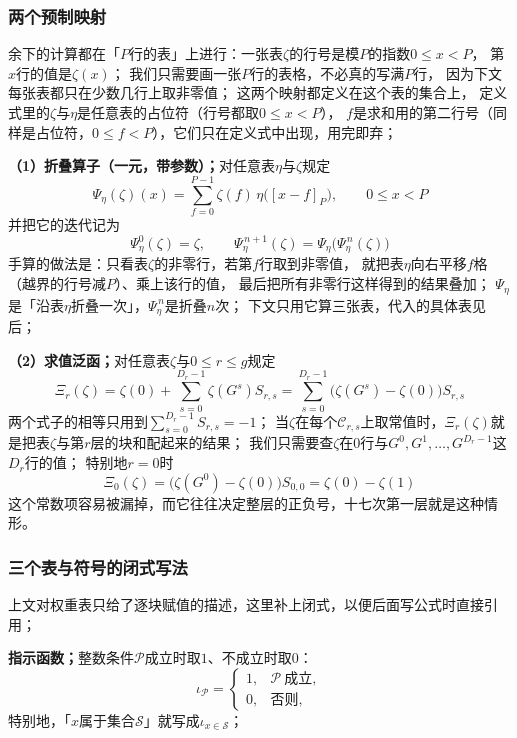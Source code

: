 \documentclass[UTF8,a4paper,11pt]{ctexart}
\begin{document}
\subsubsection{两个预制映射}
余下的计算都在「$P$行的表」上进行：一张表$\zeta$的行号是模$P$的指数$0\le x<P$，
第$x$行的值是$\zeta(x)$；
我们只需要画一张$P$行的表格，不必真的写满$P$行，
因为下文每张表都只在少数几行上取非零值；
这两个映射都定义在这个表的集合上，
定义式里的$\zeta$与$\eta$是任意表的占位符（行号都取$0\le x<P$），
$f$是求和用的第二行号（同样是占位符，$0\le f<P$），它们只在定义式中出现，用完即弃；

\textbf{（1）折叠算子（一元，带参数）；}对任意表$\eta$与$\zeta$规定
\[
 \Psi_\eta(\zeta)(x)=\sum_{f=0}^{P-1}\zeta(f)\,\eta\bigl([x-f]_P\bigr),\qquad 0\le x<P
\]
并把它的迭代记为
\[
 \Psi_\eta^{0}(\zeta)=\zeta,\qquad
 \Psi_\eta^{\,n+1}(\zeta)=\Psi_\eta\bigl(\Psi_\eta^{\,n}(\zeta)\bigr)
\]
手算的做法是：只看表$\zeta$的非零行，若第$f$行取到非零值，
就把表$\eta$向右平移$f$格（越界的行号减$P$）、乘上该行的值，
最后把所有非零行这样得到的结果叠加；
$\Psi_\eta$是「沿表$\eta$折叠一次」，$\Psi_\eta^{\,n}$是折叠$n$次；
下文只用它算三张表，代入的具体表见后；\par

\textbf{（2）求值泛函；}对任意表$\zeta$与$0\le r\le g$规定
\[
 \Xi_r(\zeta)=\zeta(0)+\sum_{s=0}^{D_r-1}\zeta(G^s)S_{r,s}
 =\sum_{s=0}^{D_r-1}\bigl(\zeta(G^s)-\zeta(0)\bigr)S_{r,s}
\]
两个式子的相等只用到$\sum_{s=0}^{D_r-1}S_{r,s}=-1$；
当$\zeta$在每个$\mathscr{C}_{r,s}$上取常值时，$\Xi_r(\zeta)$就是把表$\zeta$与第$r$层的块和配起来的结果；
我们只需要查$\zeta$在$0$行与$G^0,G^1,\dots,G^{D_r-1}$这$D_r$行的值；
特别地$r=0$时
\[
 \Xi_0(\zeta)=\bigl(\zeta(G^0)-\zeta(0)\bigr)S_{0,0}=\zeta(0)-\zeta(1)
\]
这个常数项容易被漏掉，而它往往决定整层的正负号，十七次第一层就是这种情形。\par

\subsubsection{三个表与符号的闭式写法}
上文对权重表只给了逐块赋值的描述，这里补上闭式，以便后面写公式时直接引用；

\textbf{指示函数；}整数条件$\mathscr{P}$成立时取$1$、不成立时取$0$：
\[
 \iota_{\mathscr{P}}=
 \begin{cases}
 1, & \mathscr{P}\ \text{成立},\\
 0, & \text{否则},
 \end{cases}
\]
特别地，「$x$属于集合$\mathscr{S}$」就写成$\iota_{x\in\mathscr{S}}$；\par
\end{document}
